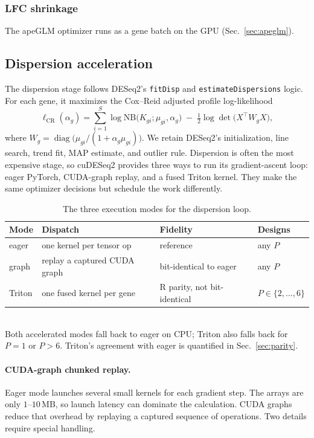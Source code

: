 \documentclass[12pt]{article}
\newcommand{\cudeseq}{cuDESeq2}
\begin{document}
\subsubsection{LFC shrinkage}
\label{sec:apeglm-overview}
The apeGLM optimizer runs as a gene batch on the GPU
(Sec.~\ref{sec:apeglm}).

\subsection{Dispersion acceleration}
\label{sec:disp}
The dispersion stage follows DESeq2's \texttt{fitDisp} and
\texttt{estimateDispersions} logic. For each gene, it maximizes the Cox--Reid
adjusted profile log-likelihood
\begin{equation}
\ell_{\mathrm{CR}}(\alpha_g)=\sum_{i=1}^{S}\log \mathrm{NB}\!\bigl(K_{gi};\mu_{gi},\alpha_g\bigr)
\;-\;\tfrac12\log\det\!\bigl(X^{\!\top} W_g X\bigr),
\label{eq:cr}
\end{equation}
where $W_g=\operatorname{diag}\!\bigl(\mu_{gi}/(1+\alpha_g\mu_{gi})\bigr)$.
We retain DESeq2's initialization, line search, trend fit, MAP estimate, and
outlier rule. Dispersion is often the most expensive stage, so \cudeseq{}
provides three ways to run its gradient-ascent loop: eager PyTorch, CUDA-graph
replay, and a fused Triton kernel. They make the same optimizer decisions but
schedule the work differently.

\begin{table}[htbp]\centering
\caption{The three execution modes for the dispersion loop.}
\label{tab:modes}
{\footnotesize
\begin{tabular}{llll}
\toprule
Mode & Dispatch & Fidelity & Designs \\\midrule
eager  & one kernel per tensor op        & reference          & any $P$ \\
graph  & replay a captured CUDA graph     & bit-identical to eager & any $P$ \\
Triton & one fused kernel per gene        & R parity, not bit-identical & $P\in\{2,\dots,6\}$ \\\bottomrule
\end{tabular}}
\\[3pt]
{\footnotesize Both accelerated modes fall back to eager on CPU; Triton also
falls back for $P=1$ or $P>6$. Triton's agreement with eager is quantified in
Sec.~\ref{sec:parity}.}
\end{table}

\paragraph{CUDA-graph chunked replay.}
\label{sec:graph}
Eager mode launches several small kernels for each gradient step. The arrays
are only $1$--$10$\,MB, so launch latency can dominate the calculation. CUDA
graphs reduce that overhead by replaying a captured sequence of operations.
Two details require special handling.
\end{document}
